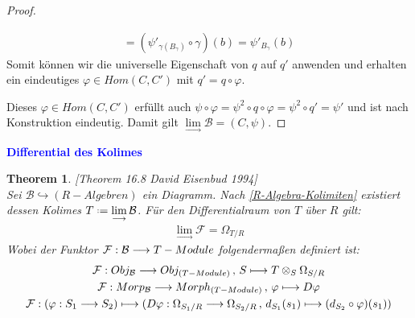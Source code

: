 \documentclass[10pt,a4paper]{report}
\newcommand{\ModulsOfDifferenzials}{David Eisenbud 1994}
\newcounter{Aussage}[chapter]
\newtheorem{theorem}[Aussage]{Theorem}
\newcommand{\functionfront}[3]{\nolinebreak{#1:#2 \longrightarrow #3}}
\newcommand{\functionback}[3]{\nolinebreak{#1:#2 \longmapsto #3}}
\newcommand{\function}[5]{\nolinebreak{#1:#2 \longrightarrow #3 \, , \, #4 \longmapsto #5}}
\newcommand{\divR}[2]{\Omega_{#1/#2}}
\newcommand{\divf}[1]{d_{#1}}
\newcommand{\Tensor}[3]{#1 \otimes_{#2} #3}
\newcommand{\colimes}[0]{\lim\limits_{ \longrightarrow }}
\newcommand*{\defeq}{\mathrel{\vcenter{\baselineskip0.5ex \lineskiplimit0pt
                     \hbox{\scriptsize.}\hbox{\scriptsize.}}}%
                     =}
\begin{document}
\begin{proof}
{\begin{itemize}
\begin{gather*}
= (\psi'_{\gamma(B_{\gamma})} \circ \gamma)(b)
= \psi'_{B_{\gamma}}(b)
\end{gather*}
Somit können wir die universelle Eigenschaft von $q$ auf $q'$ anwenden und erhalten ein eindeutiges $\varphi \in Hom(C,C')$ mit $q' = q \circ \varphi$.
\begin{center}
\end{center}
\end{itemize}
Dieses $\varphi \in Hom(C,C')$ erfüllt auch $\psi \circ \varphi = \psi^2 \circ q \circ \varphi = \psi^2 \circ q' = \psi'$ und ist nach Konstruktion eindeutig. Damit gilt $\colimes \mathcal{B} = (C,\psi)$.
}
\end{proof}









\textcolor{blue}{\textbf{Differential des Kolimes}}
\begin{theorem} \label{Differential des Kolimes} \textit{[Theorem 16.8 \ModulsOfDifferenzials]}\\
Sei $\mathcal{B} \hookrightarrow (R-Algebren)$ ein Diagramm. Nach \cref{R-Algebra-Kolimiten} existiert dessen Kolimes $T \defeq \colimes \mathcal{B}$. Für den Differentialraum von $T$ über $R$ gilt:
\begin{gather*}
\colimes \mathcal{F} = \divR{T}{R}
\end{gather*}
Wobei der Funktor $\functionfront{\mathcal{F}}{\mathcal{B}}{T-Module}$ folgendermaßen definiert ist:
\begin{gather*}
\function{\mathcal{F}}{Obj_{\mathcal{B}}}{Obj_{(T-Module)}}{S}{\Tensor{T}{S}{\divR{S}{R}}}\\
\function{\mathcal{F}}{Morp_{\mathcal{B}}}{Morph_{(T-Module)}}{\varphi}{D\varphi}\\
\functionback{\mathcal{F}}{(\functionfront{\varphi}{S_1}{S_2})}{(\function{D\varphi}{\divR{S_1}{R}}{\divR{S_2}{R}}{\divf{S_1}(s_1)}{(\divf{S_2} \circ \varphi)(s_1)})}
\end{gather*} 
\end{theorem}
\end{document}
